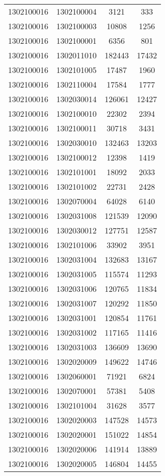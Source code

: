 \begin{longtable}{llcc}
1302100016 & 1302100004 & 3121 & 333\\
1302100016 & 1302100003 & 10808 & 1256\\
1302100016 & 1302100001 & 6356 & 801\\
1302100016 & 1302011010 & 182443 & 17432\\
1302100016 & 1302101005 & 17487 & 1960\\
1302100016 & 1302110004 & 17584 & 1777\\
1302100016 & 1302030014 & 126061 & 12427\\
1302100016 & 1302100010 & 22302 & 2394\\
1302100016 & 1302100011 & 30718 & 3431\\
1302100016 & 1302030010 & 132463 & 13203\\
1302100016 & 1302100012 & 12398 & 1419\\
1302100016 & 1302101001 & 18092 & 2033\\
1302100016 & 1302101002 & 22731 & 2428\\
1302100016 & 1302070004 & 64028 & 6140\\
1302100016 & 1302031008 & 121539 & 12090\\
1302100016 & 1302030012 & 127751 & 12587\\
1302100016 & 1302101006 & 33902 & 3951\\
1302100016 & 1302031004 & 132683 & 13167\\
1302100016 & 1302031005 & 115574 & 11293\\
1302100016 & 1302031006 & 120765 & 11834\\
1302100016 & 1302031007 & 120292 & 11850\\
1302100016 & 1302031001 & 120854 & 11761\\
1302100016 & 1302031002 & 117165 & 11416\\
1302100016 & 1302031003 & 136609 & 13690\\
1302100016 & 1302020009 & 149622 & 14746\\
1302100016 & 1302060001 & 71921 & 6824\\
1302100016 & 1302070001 & 57381 & 5408\\
1302100016 & 1302101004 & 31628 & 3577\\
1302100016 & 1302020003 & 147528 & 14573\\
1302100016 & 1302020001 & 151022 & 14854\\
1302100016 & 1302020006 & 141914 & 13889\\
1302100016 & 1302020005 & 146804 & 14455\\

\end{longtable}
